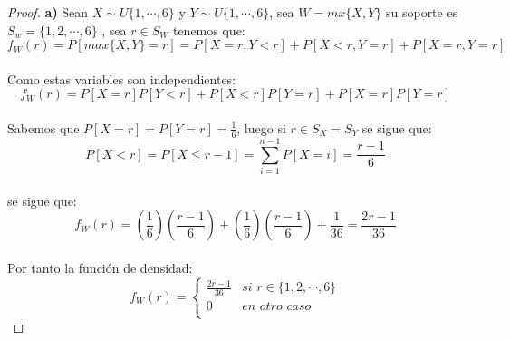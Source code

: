 \documentclass[11pt,letterpaper]{article}
\begin{document}
\begin{proof}
    \textbf{a)}\,\,Sean $X\sim U\{1,\cdots,6\}$ y $Y\sim U\{1,\cdots,6\}$, sea $W=mx\{X,Y\}$
    su soporte es $S_w=\{1,2,\cdots,6\}$ , sea $r\in S_{W}$ tenemos que:\,\\
    \begin{equation*}
        f_{W}(r)=P[max\{X,Y\}=r]=P[X=r,Y<r]+P[X<r,Y=r]+P[X=r,Y=r]
    \end{equation*}\,\\
    Como estas variables son independientes:\,\\
    \begin{equation*}
        f_{W}(r)=P[X=r]P[Y<r]+P[X<r]P[Y=r]+P[X=r]P[Y=r]
    \end{equation*}\,\\
    Sabemos que $P[X=r]=P[Y=r]=\frac{1}{6}$, luego si $r\in S_{X}=S_{Y}$ se sigue que:\,\\
    \begin{equation*}
        P[X<r]=P[X\leq r-1]=\sum_{i=1}^{n-1}P[X=i]=\frac{r-1}{6}
    \end{equation*}\,\\
    se sigue que:\,\\
    \begin{equation*}
        f_{W}(r)=\left(\frac{1}{6}\right)\left(\frac{r-1}{6}\right)+\left(\frac{1}{6}\right)\left(\frac{r-1}{6}\right)+\frac{1}{36}=\frac{2r-1}{36}
    \end{equation*}\,\\
    Por tanto la funci\'on de densidad:
    \[
f_{W}(r) =
\begin{cases}
\frac{2r-1}{36} & si\,\,r\in \{1,2,\cdots,6\}\\
0 & en\,\,otro\,\,caso \\

\end{cases}\]
\end{proof}
\end{document}
